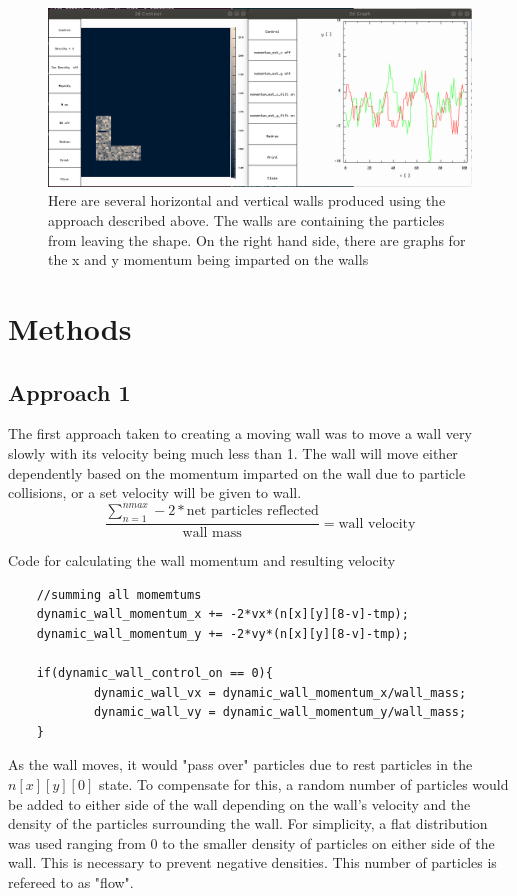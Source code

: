\documentclass{article}
\begin{document}
\begin{figure}[H]
\includegraphics[scale=0.2]{p1_noleakage.png}
\caption{\label{fig} Here are several horizontal and vertical walls produced using the approach described above. The walls are containing the particles from leaving the shape. On the right hand side, there are graphs for the x and y momentum being imparted on the walls}
\end{figure}

\section{Methods}

\subsection{Approach 1}

The first approach taken to creating a moving wall was to move a wall very slowly with its velocity being much less than 1. The wall will move either dependently based on the momentum imparted on the wall due to particle collisions, or a set velocity will be given to wall.
 $$\frac{\sum_{n=1}^{nmax} -2*\textrm{net particles reflected}}{\textrm{wall mass}} = \textrm{wall velocity}$$
\vspace{5mm}

Code for calculating the wall momentum and resulting velocity
\begin{verbatim}
    //summing all momemtums
    dynamic_wall_momentum_x += -2*vx*(n[x][y][8-v]-tmp);
    dynamic_wall_momentum_y += -2*vy*(n[x][y][8-v]-tmp);

	if(dynamic_wall_control_on == 0){
    		dynamic_wall_vx = dynamic_wall_momentum_x/wall_mass;
    		dynamic_wall_vy = dynamic_wall_momentum_y/wall_mass;
	}
\end{verbatim}
\vspace{5mm}

As the wall moves, it would "pass over" particles due to rest particles in the $n[x][y][0]$ state. To compensate for this, a random number of particles would be added to either side of the wall depending on the wall's velocity and the density of the particles surrounding the wall. For simplicity, a flat distribution was used ranging from 0 to the smaller density of particles on either side of the wall. This is necessary to prevent negative densities. This number of particles is refereed to as "flow".
\end{document}
